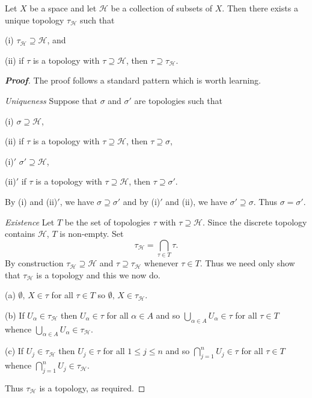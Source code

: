 \begin{lemma}\label{L;coarsest topology}
Let $X$ be a space and let ${\mathcal H}$ be a
collection of subsets of $X$. Then there exists a unique topology
$\tau_{{\mathcal H}}$ such that

(i) $\tau_{{\mathcal H}}\supseteq{\mathcal H}$, and

(ii) if $\tau$ is a topology with $\tau\supseteq {\mathcal H}$,
then $\tau\supseteq \tau_{{\mathcal H}}$.
\end{lemma}
\begin{proof}[\bf Proof] The proof follows a standard pattern which is
worth learning.

\noindent\emph{Uniqueness} Suppose that $\sigma$ and $\sigma'$ are topologies
such that

(i) $\sigma\supseteq{\mathcal H}$,

(ii) if $\tau$ is a topology with $\tau\supseteq {\mathcal H}$,
then $\tau\supseteq \sigma$,

(i)$'$ $\sigma'\supseteq{\mathcal H}$,

(ii)$'$ if $\tau$ is a topology with $\tau\supseteq {\mathcal H}$,
then $\tau\supseteq \sigma'$.

\noindent By (i) and (ii)$'$, we have $\sigma\supseteq \sigma'$
and by (i)$'$ and (ii), we have $\sigma'\supseteq \sigma$.
Thus $\sigma=\sigma'$.

\noindent\emph{Existence} Let $T$ be the set of topologies
$\tau$ with $\tau\supseteq {\mathcal H}$. Since the discrete
topology contains ${\mathcal H}$, $T$ is non-empty.
Set
\[\tau_{\mathcal H}=\bigcap_{\tau\in T}\tau.\]
By construction $\tau_{\mathcal H}\supseteq{\mathcal H}$ and
$\tau\supseteq \tau_{\mathcal H}$ whenever $\tau\in T$.
Thus we need only show that $\tau_{\mathcal H}$ is a topology
and this we now do.

(a) ${\emptyset},\,X\in\tau$ for all $\tau\in T$ so ${\emptyset},\,X\in\tau_{\mathcal H}$.

(b) If $U_{\alpha}\in \tau_{\mathcal H}$ then $U_{\alpha}\in\tau$ for all $\alpha\in A$ and so  $\bigcup_{\alpha\in A}U_{\alpha}\in\tau$ for all $\tau\in T$ whence $\bigcup_{\alpha\in A}U_{\alpha}\in \tau_{\mathcal H}$.

(c) If $U_{j}\in \tau_{\mathcal H}$ then $U_{j}\in\tau$ for all $1\leq j\leq n$ and so $\bigcap_{j=1}^{n}U_{j}\in\tau$ for all $\tau\in T$ whence
$\bigcap_{j=1}^{n} U_{j}\in \tau_{\mathcal H}$.

Thus $\tau_{\mathcal H}$ is a topology, as required.
\end{proof}


